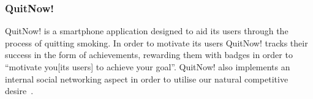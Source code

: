 \documentclass[a4paper,12pt]{article}
\begin{document}
\begin{figure}[!ht]
\begin{minipage}{.5\textwidth}
  \label{application-runkeeper-social}
\end{minipage}
\end{figure}


\subsubsection{QuitNow!}
QuitNow! is a smartphone application designed to aid its users through the process of quitting smoking.
In order to motivate its users QuitNow! tracks their success in the form of achievements, rewarding them with badges in order to ``motivate you[its users] to achieve your goal''\citep{quitnow}. QuitNow! also implements an internal social networking aspect in order to utilise our natural competitive desire~\citep{bread-and-games}.\\
\end{document}

